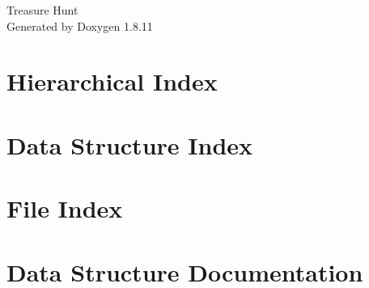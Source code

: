 \documentclass[twoside]{book}
\newcommand{\+}{\discretionary{\mbox{\scriptsize$\hookleftarrow$}}{}{}}
\newcommand{\clearemptydoublepage}{%
  \newpage{\pagestyle{empty}\cleardoublepage}%
}
\begin{document}
\hypersetup{pageanchor=false,
             bookmarksnumbered=true,
             pdfencoding=unicode
            }
\begin{titlepage}
\vspace*{7cm}
\begin{center}%
{\Large Treasure Hunt }\\
\vspace*{1cm}
{\large Generated by Doxygen 1.8.11}\\
\end{center}
\end{titlepage}
\clearemptydoublepage
\tableofcontents
\clearemptydoublepage
{}
\hypersetup{pageanchor=true}

\chapter{Hierarchical Index}

\chapter{Data Structure Index}

\chapter{File Index}

\chapter{Data Structure Documentation}
















































\end{document}
